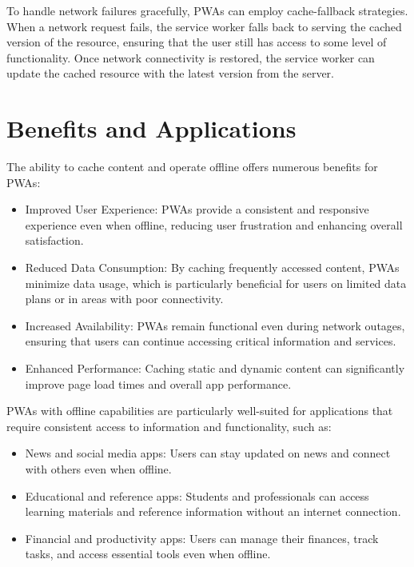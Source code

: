 \documentclass{report}
\begin{document}
To handle network failures gracefully, PWAs can employ cache-fallback strategies. When a network request fails, the service worker falls back to serving the cached version of the resource, ensuring that the user still has access to some level of functionality. Once network connectivity is restored, the service worker can update the cached resource with the latest version from the server.\cite{stackoverflow_pwa_offline_cache}

\section{Benefits and Applications}\label{Benefits and Applications}
The ability to cache content and operate offline offers numerous benefits for PWAs:\cite{kouassi2021_pwa_cache_offline}
\begin{itemize}
    \item Improved User Experience: PWAs provide a consistent and responsive experience even when offline, reducing user frustration and enhancing overall satisfaction.
    \item Reduced Data Consumption: By caching frequently accessed content, PWAs minimize data usage, which is particularly beneficial for users on limited data plans or in areas with poor connectivity.
    \item Increased Availability: PWAs remain functional even during network outages, ensuring that users can continue accessing critical information and services.
    \item Enhanced Performance: Caching static and dynamic content can significantly improve page load times and overall app performance.
\end{itemize}

PWAs with offline capabilities are particularly well-suited for applications that require consistent access to information and functionality, such as:
\begin{itemize}
    \item News and social media apps: Users can stay updated on news and connect with others even when offline.
    \item Educational and reference apps: Students and professionals can access learning materials and reference information without an internet connection.
    \item Financial and productivity apps: Users can manage their finances, track tasks, and access essential tools even when offline.
\end{itemize}
\end{document}
